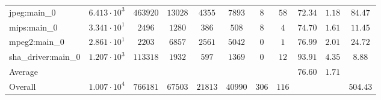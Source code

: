 \begin{tabular}{|l|c|c|c|c|c|c|c|c|c|c|}
jpeg:main\_0            & $ 6.413 \cdot 10^{3} $ & $ 463920 $ & $ 13028 $ & $ 4355  $ & $ 7893  $ & $ 8   $ & $ 58  $ & $ 72.34       $ & $ 1.18    $ & $ 84.47   $ \\
mips:main\_0            & $ 3.341 \cdot 10^{1} $ & $ 2496   $ & $ 1280  $ & $ 386   $ & $ 508   $ & $ 8   $ & $ 4   $ & $ 74.70       $ & $ 1.61    $ & $ 11.45   $ \\
mpeg2:main\_0           & $ 2.861 \cdot 10^{1} $ & $ 2203   $ & $ 6857  $ & $ 2561  $ & $ 5042  $ & $ 0   $ & $ 1   $ & $ 76.99       $ & $ 2.01    $ & $ 24.72   $ \\
sha\_driver:main\_0     & $ 1.207 \cdot 10^{3} $ & $ 113318 $ & $ 1932  $ & $ 597   $ & $ 1369  $ & $ 0   $ & $ 12  $ & $ 93.91       $ & $ 4.35    $ & $ 8.88    $ \\
\hline
Average                 & $                    $ & $        $ & $       $ & $       $ & $       $ & $     $ & $     $ & $ 76.60       $ & $ 1.71    $ & $         $ \\
\hline
Overall                 & $ 1.007 \cdot 10^{4} $ & $ 766181 $ & $ 67503 $ & $ 21813 $ & $ 40990 $ & $ 306 $ & $ 116 $ & $             $ & $         $ & $ 504.43  $ \\
\hline
\end{tabular}
